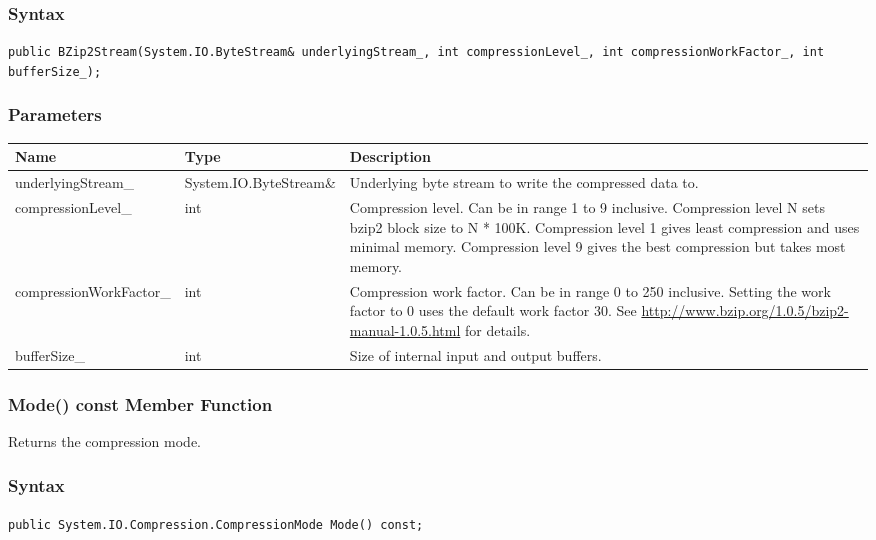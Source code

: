 \documentclass[a4paper,oneside,11.000000pt]{book}
\begin{document}
\subsubsection*{Syntax}
\texttt{public BZip2Stream(System.IO.ByteStream\& underlyingStream\_, int compressionLevel\_, int compressionWorkFactor\_, int bufferSize\_);}
\subsubsection*{Parameters}
\begin{flushleft}
\begin{supertabular}[l]{!{\raggedright}p{4.93333cm}!{\raggedright}p{4.93333cm}!{\raggedright}p{4.93333cm}}
\textbf{Name}
& \textbf{Type}
& \textbf{Description}
\\
\hline
underlyingStream\_
& System.\-IO.\-ByteStream\&\-
& Underlying byte stream to write the compressed data to.

\\
compressionLevel\_
& int
& Compression level. Can be in range 1 to 9 inclusive. Compression level N sets bzip2 block size to N * 100K.
Compression level 1 gives least compression and uses minimal memory.
Compression level 9 gives the best compression but takes most memory.

\\
compressionWorkFactor\_
& int
& Compression work factor. Can be in range 0 to 250 inclusive. Setting the work factor to 0 uses the default work factor 30.
See \url{http://www.bzip.org/1.0.5/bzip2-manual-1.0.5.html} for details.

\\
bufferSize\_
& int
& Size of internal input and output buffers.

\\
\end{supertabular}

\end{flushleft}
\clearpage

\hypertarget{System.IO.Compression.BZip2Stream.Mode.C.P.System.IO.Compression.BZip2Stream}{\subsubsection*{Mode() const Member Function}}\begin{flushleft}
Returns the compression mode.

\end{flushleft}

\subsubsection*{Syntax}\texttt{public System.IO.Compression.CompressionMode Mode() const;}
\end{document}
